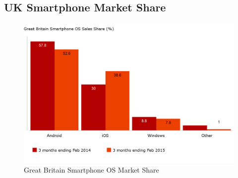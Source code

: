 \begin{landscape}
\chapter{UK Smartphone Market Share}
\label{appendix:uksmartphonemarketshare}

\begin{figure}[ht]
	\centering
	\includegraphics[scale=0.25]{images/UKSmartphoneSales.png}
	\caption{Great Britain Smartphone OS Market Share \citep{kantargbsmartphonereport}}
\end{figure}
\end{landscape}